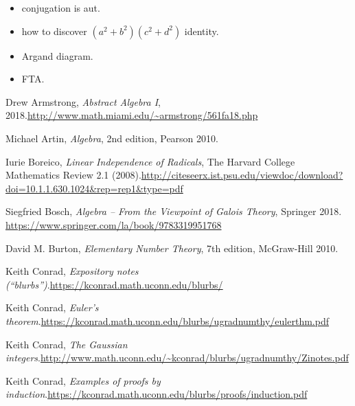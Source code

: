 \documentclass[numbers=enddot,12pt,final,onecolumn,notitlepage]{scrartcl}%
\numberwithin{exer}{subsection}
\theoremstyle{definition}
\begin{document}
\begin{itemize}
\item conjugation is aut.

\item how to discover $\left(  a^{2}+b^{2}\right)  \left(  c^{2}+d^{2}\right)
$ identity.

\item Argand diagram.

\item FTA.
\end{itemize}

\begin{thebibliography}{999999999}                                                                                        %


Drew Armstrong, \textit{Abstract Algebra I},
2018.\newline\url{http://www.math.miami.edu/~armstrong/561fa18.php}

Michael Artin, \textit{Algebra}, 2nd edition, Pearson 2010.

Iurie Boreico, \textit{Linear Independence of
Radicals}, The Harvard College Mathematics Review 2.1 (2008).\newline\url{http://citeseerx.ist.psu.edu/viewdoc/download?doi=10.1.1.630.1024&rep=rep1&type=pdf}

Siegfried Bosch, \textit{Algebra -- From the Viewpoint
of Galois Theory}, Springer 2018. \newline\url{https://www.springer.com/la/book/9783319951768}

David M. Burton, \textit{Elementary Number Theory},
7th edition, McGraw-Hill 2010.

Keith Conrad, \textit{Expository notes
(\textquotedblleft blurbs\textquotedblright)}.\newline\url{https://kconrad.math.uconn.edu/blurbs/}

Keith Conrad, \textit{Euler's theorem}.\newline\url{https://kconrad.math.uconn.edu/blurbs/ugradnumthy/eulerthm.pdf}

Keith Conrad, \textit{The Gaussian
integers}.\newline\url{http://www.math.uconn.edu/~kconrad/blurbs/ugradnumthy/Zinotes.pdf}

Keith Conrad, \textit{Examples of proofs by
induction}.\newline\url{https://kconrad.math.uconn.edu/blurbs/proofs/induction.pdf}


\end{thebibliography}
\end{document}
